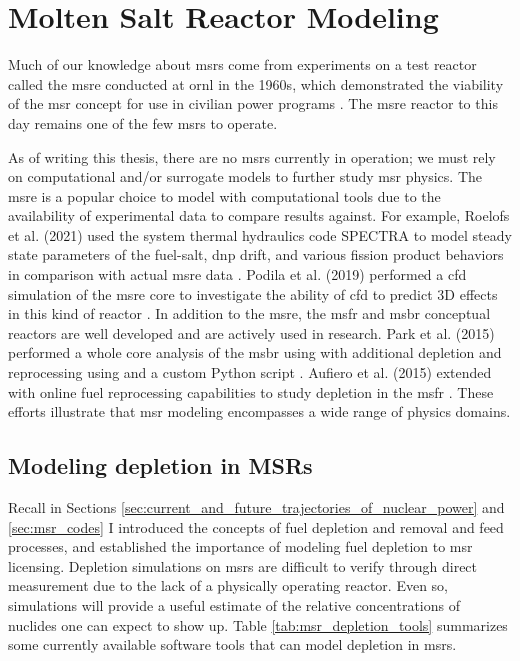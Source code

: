 \chapter{Molten Salt Reactor Modeling}%
\label{ch:chapter2}
Much of our knowledge about \Gls{msr}s come from experiments on a test reactor
called the \Gls{msre} conducted at \Gls{ornl} in the 1960s, which demonstrated
the viability of the \Gls{msr} concept for use in civilian power programs
\cite{haubenreich_experience_1970} \cite{rosenthal_history_1970}.
The \Gls{msre} reactor to this day remains one of the few \Gls{msr}s to operate.

As of writing this thesis, there are no \Gls{msr}s currently in operation; we
must rely on computational and/or surrogate models to further study \Gls{msr}
physics. The \Gls{msre} is a popular choice to model with computational tools due to the
availability of experimental data to compare results against. For example,
Roelofs et al. (2021) used the system thermal hydraulics code SPECTRA to model
steady state parameters of the fuel-salt, \gls{dnp} drift, and various fission
product behaviors in comparison with actual \Gls{msre} data \cite{roelofs_molten_2021}.
Podila et al. (2019) performed a \Gls{cfd} simulation of the \Gls{msre} core to
investigate the ability of \Gls{cfd} to predict 3D effects in this kind of
reactor \cite{podila_cfd_2019}. 
In addition to the \Gls{msre}, the \Gls{msfr} \cite{merle-lucotte_launching_2011}
and \Gls{msbr} \cite{robertson_conceptual_1971} conceptual reactors are well
developed and are actively used in research. Park et al. (2015) performed a
whole core analysis of the \Gls{msbr} using \MCNPSIX with additional depletion
and reprocessing using \CINDERNINETY and a custom Python script \cite{park_whole_2015}. Aufiero et al. (2015) extended \SerpentTWO with online
fuel reprocessing capabilities to study depletion in the \Gls{msfr}
\cite{aufiero_extended_2013}. These efforts illustrate that \Gls{msr} modeling
encompasses a wide range of physics domains.

\section{Modeling depletion in MSRs} Recall in Sections
\ref{sec:current_and_future_trajectories_of_nuclear_power} and \ref{sec:msr_codes} I introduced the
concepts of fuel depletion and removal and feed processes, and established
the importance of modeling fuel depletion to \Gls{msr} licensing. Depletion
simulations on \Gls{msr}s are difficult to verify through direct
measurement due to the lack of a physically operating reactor. Even so,
simulations will provide a useful estimate of the relative concentrations of
nuclides one can expect to show up. Table \ref{tab:msr_depletion_tools}
summarizes some currently available software tools that can model depletion in
\Gls{msr}s. 

